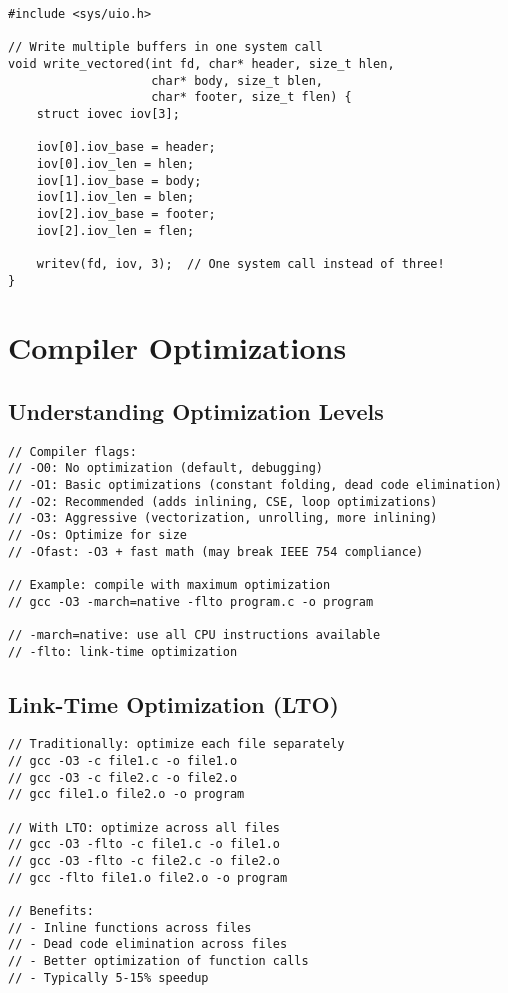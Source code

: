 \begin{lstlisting}
#include <sys/uio.h>

// Write multiple buffers in one system call
void write_vectored(int fd, char* header, size_t hlen,
                    char* body, size_t blen,
                    char* footer, size_t flen) {
    struct iovec iov[3];

    iov[0].iov_base = header;
    iov[0].iov_len = hlen;
    iov[1].iov_base = body;
    iov[1].iov_len = blen;
    iov[2].iov_base = footer;
    iov[2].iov_len = flen;

    writev(fd, iov, 3);  // One system call instead of three!
}
\end{lstlisting}

\section{Compiler Optimizations}

\subsection{Understanding Optimization Levels}

\begin{lstlisting}
// Compiler flags:
// -O0: No optimization (default, debugging)
// -O1: Basic optimizations (constant folding, dead code elimination)
// -O2: Recommended (adds inlining, CSE, loop optimizations)
// -O3: Aggressive (vectorization, unrolling, more inlining)
// -Os: Optimize for size
// -Ofast: -O3 + fast math (may break IEEE 754 compliance)

// Example: compile with maximum optimization
// gcc -O3 -march=native -flto program.c -o program

// -march=native: use all CPU instructions available
// -flto: link-time optimization
\end{lstlisting}

\subsection{Link-Time Optimization (LTO)}

\begin{lstlisting}
// Traditionally: optimize each file separately
// gcc -O3 -c file1.c -o file1.o
// gcc -O3 -c file2.c -o file2.o
// gcc file1.o file2.o -o program

// With LTO: optimize across all files
// gcc -O3 -flto -c file1.c -o file1.o
// gcc -O3 -flto -c file2.c -o file2.o
// gcc -flto file1.o file2.o -o program

// Benefits:
// - Inline functions across files
// - Dead code elimination across files
// - Better optimization of function calls
// - Typically 5-15% speedup
\end{lstlisting}

